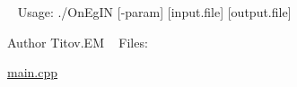 ~\newline
Usage\+: ./\+On\+Eg\+IN \mbox{[}-\/param\mbox{]} \mbox{[}input.\+file\mbox{]} \mbox{[}output.\+file\mbox{]} ~\newline
\begin{DoxyAuthor}{Author}
Titov.\+EM ~\newline
Files\+: ~\newline

\begin{DoxyItemize}
\item \hyperlink{main_8cpp}{main.\+cpp} ~\newline
 
\end{DoxyItemize}
\end{DoxyAuthor}

